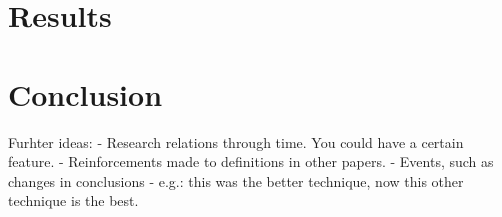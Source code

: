 \documentclass[11pt,a4paper,openright]{memoir}
\begin{document}
\chapter{Results}

\chapter{Conclusion}

Furhter ideas:
- Research relations through time. You could have a certain feature.
- Reinforcements made to definitions in other papers.
- Events, such as changes in conclusions - e.g.: this was the better technique, now this other technique is the best.

\backmatter

\printbibliography

\appendix
\end{document}
